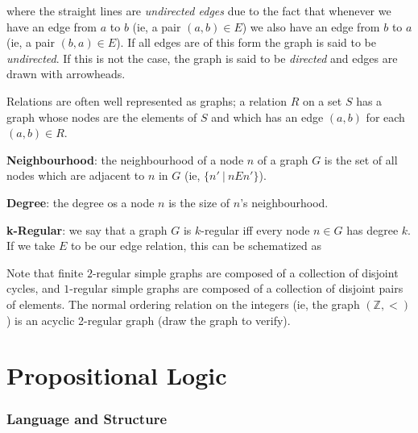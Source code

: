 
where the straight lines are \emph{undirected edges} due to the fact that whenever we have an edge from $a$ to $b$ (ie, a pair $(a, b) \in E$) we also have an edge from $b$ to $a$ (ie, a pair $(b, a) \in E$). If all edges are of this form the graph is said to be \emph{undirected}. If this is not the case, the graph is said to be \emph{directed} and edges are drawn with arrowheads. 

Relations are often well represented as graphs; a relation $R$ on a set $S$ has a graph whose nodes are the elements of $S$ and which has an edge $(a, b)$ for each $(a, b) \in R$. 

\textbf{Neighbourhood}: the neighbourhood of a node $n$ of a graph $G$ is the set of all nodes which are adjacent to $n$ in $G$ (ie, $\{n'\ |\ nEn' \}$).

\textbf{Degree}: the degree os a node $n$ is the size of $n$'s neighbourhood. 

\textbf{k-Regular}: we say that a graph $G$ is $k$-regular iff every node $n \in G$ has degree $k$. If we take $E$ to be our edge relation, this can be schematized as 

Note that finite $2$-regular simple graphs are composed of a collection of disjoint cycles, and $1$-regular simple graphs are composed of a collection of disjoint pairs of elements. The normal ordering relation on the integers (ie, the graph $(\mathbb{Z}, <)$) is an acyclic 2-regular graph (draw the graph to verify). 

\newpage
\part{Propositional Logic}
\section{Language and Structure}

